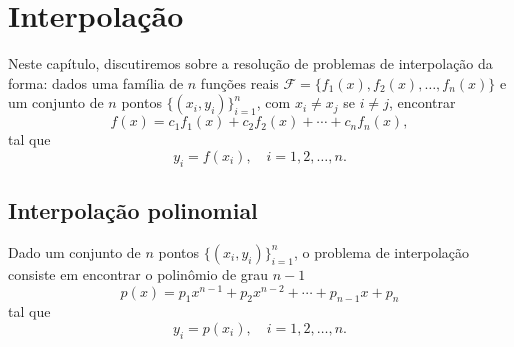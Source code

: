 

\chapter{Interpolação}\label{cap_interp}
\thispagestyle{fancy}

Neste capítulo, discutiremos sobre a resolução de problemas de interpolação da forma: dados uma família de $n$ funções reais $\mathcal{F} = \{f_1(x), f_2(x), \ldots, f_n(x)\}$ e um conjunto de $n$ pontos $\{(x_i, y_i)\}_{i=1}^n$, com $x_i\neq x_j$ se $i\neq j$, encontrar
\begin{equation}
  f(x) = c_1f_1(x) + c_2f_2(x) + \cdots + c_nf_n(x),
\end{equation}
tal que
\begin{equation}
  y_i = f(x_i),\quad i=1, 2, \ldots, n.
\end{equation}

\section{Interpolação polinomial}\label{cap_interp_sec_interpoli}

Dado um conjunto de $n$ pontos $\{(x_i, y_i)\}_{i=1}^n$, o problema de interpolação consiste em encontrar o polinômio de grau $n-1$
\begin{equation}\label{eq:interpoli_poli}
  p(x) = p_1x^{n-1} + p_2x^{n-2} + \cdots + p_{n-1}x + p_n
\end{equation}
tal que
\begin{equation}\label{eq:interpoli_conds}
  y_i = p(x_i),\quad i=1, 2, \ldots, n.
\end{equation}

